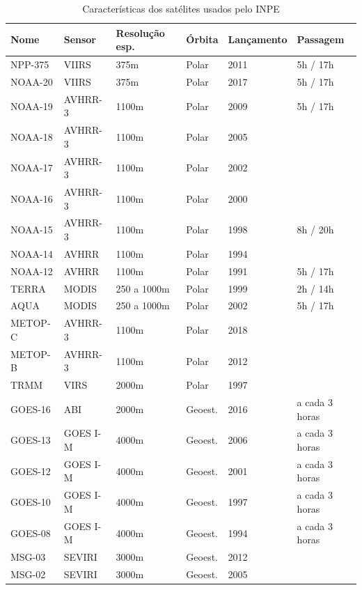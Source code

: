 \documentclass[cic,tc]{iiufrgs}
\begin{document}
\begin{table}[h!]
\centering
\caption{Características dos satélites usados pelo INPE}
\begin{tabular}{ | l l l l l l | }
\hline
  Nome    & Sensor & Resolução esp. & Órbita & Lançamento & Passagem \\
\hline
  NPP-375 & VIIRS    & 375m        & Polar   & 2011 & 5h / 17h \\
  NOAA-20 & VIIRS    & 375m        & Polar   & 2017 & 5h / 17h \\
  NOAA-19 & AVHRR-3  & 1100m       & Polar   & 2009 & 5h / 17h \\
  NOAA-18 & AVHRR-3  & 1100m       & Polar   & 2005 &  \\
  NOAA-17 & AVHRR-3  & 1100m       & Polar   & 2002 &  \\
  NOAA-16 & AVHRR-3  & 1100m       & Polar   & 2000 &  \\
  NOAA-15 & AVHRR-3  & 1100m       & Polar   & 1998 & 8h / 20h \\
  NOAA-14 & AVHRR    & 1100m       & Polar   & 1994 & \\
  NOAA-12 & AVHRR    & 1100m       & Polar   & 1991 & 5h / 17h \\
  TERRA   & MODIS    & 250 a 1000m & Polar   & 1999 & 2h / 14h \\
  AQUA    & MODIS    & 250 a 1000m & Polar   & 2002 & 5h / 17h \\
  METOP-C & AVHRR-3  & 1100m       & Polar   & 2018 &  \\
  METOP-B & AVHRR-3  & 1100m       & Polar   & 2012 &  \\
  TRMM    & VIRS     & 2000m       & Polar   & 1997 &  \\
  GOES-16 & ABI      & 2000m       & Geoest. & 2016 & a cada 3 horas \\
  GOES-13 & GOES I-M & 4000m       & Geoest. & 2006 & a cada 3 horas \\
  GOES-12 & GOES I-M & 4000m       & Geoest. & 2001 & a cada 3 horas \\
  GOES-10 & GOES I-M & 4000m       & Geoest. & 1997 & a cada 3 horas \\
  GOES-08 & GOES I-M & 4000m       & Geoest. & 1994 & a cada 3 horas \\
  MSG-03  & SEVIRI   & 3000m       & Geoest. & 2012 &  \\
  MSG-02  & SEVIRI   & 3000m       & Geoest. & 2005 &  \\
 \hline
\end{tabular}
\label{table:satelites}
\end{table}
\end{document}
